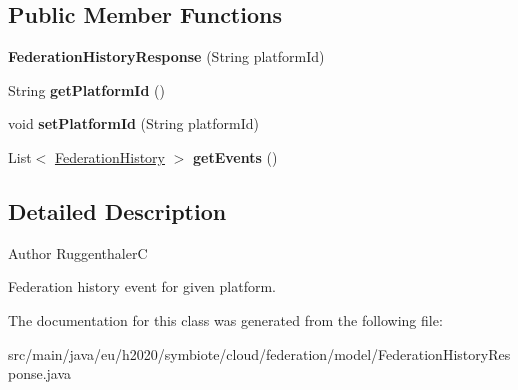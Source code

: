 \subsection*{Public Member Functions}
\begin{DoxyCompactItemize}
\item 
\mbox{\label{classeu_1_1h2020_1_1symbiote_1_1cloud_1_1federation_1_1model_1_1FederationHistoryResponse_aa6e17af1124124d349a16b7cc7339888}} 
{\bfseries Federation\+History\+Response} (String platform\+Id)
\item 
\mbox{\label{classeu_1_1h2020_1_1symbiote_1_1cloud_1_1federation_1_1model_1_1FederationHistoryResponse_aa52afb26addaad2968f7ec5cb2d954ca}} 
String {\bfseries get\+Platform\+Id} ()
\item 
\mbox{\label{classeu_1_1h2020_1_1symbiote_1_1cloud_1_1federation_1_1model_1_1FederationHistoryResponse_a30c6c252ca047c6f3839ecb63ae8342d}} 
void {\bfseries set\+Platform\+Id} (String platform\+Id)
\item 
\mbox{\label{classeu_1_1h2020_1_1symbiote_1_1cloud_1_1federation_1_1model_1_1FederationHistoryResponse_a2abd288f06b1728ce6e3e0d58ef951a8}} 
List$<$ \hyperlink{classeu_1_1h2020_1_1symbiote_1_1cloud_1_1federation_1_1model_1_1FederationHistory}{Federation\+History} $>$ {\bfseries get\+Events} ()
\end{DoxyCompactItemize}


\subsection{Detailed Description}
\begin{DoxyAuthor}{Author}
RuggenthalerC \begin{DoxyVerb}    Federation history event for given platform.\end{DoxyVerb}
 
\end{DoxyAuthor}


The documentation for this class was generated from the following file\+:\begin{DoxyCompactItemize}
\item 
src/main/java/eu/h2020/symbiote/cloud/federation/model/Federation\+History\+Response.\+java\end{DoxyCompactItemize}
